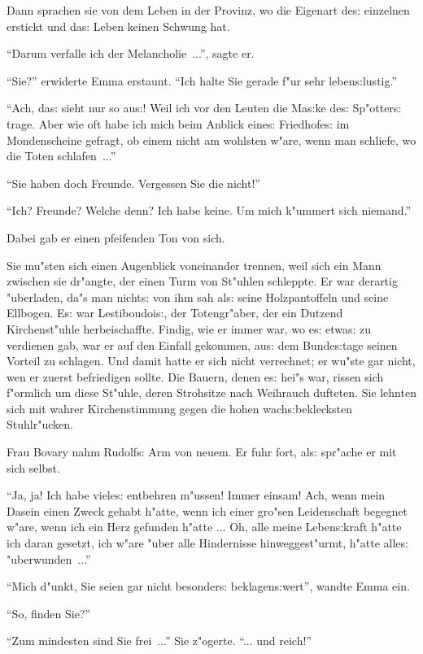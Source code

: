 \documentclass[oneside,12pt]{book}
\newcommand{\s}{s:}%
\begin{document}
Dann sprachen sie von dem Leben in der Provinz, wo die Eigenart
de{\s} einzelnen erstickt und da{\s} Leben keinen Schwung hat.

"`Darum verfalle ich der Melancholie~..."', sagte er.

"`Sie?"' erwiderte Emma erstaunt. "`Ich halte Sie gerade f"ur sehr
leben{\s}lustig."'

"`Ach, da{\s} sieht nur so au{\s}! Weil ich vor den Leuten die
Ma{\s}ke de{\s} Sp"otter{\s} trage. Aber wie oft habe ich mich
beim Anblick eine{\s} Friedhofe{\s} im Mondenscheine gefragt, ob
einem nicht am wohlsten w"are, wenn man schliefe, wo die Toten
schlafen~..."'

"`Sie haben doch Freunde. Vergessen Sie die nicht!"'

"`Ich? Freunde? Welche denn? Ich habe keine. Um mich k"ummert sich
niemand."'

Dabei gab er einen pfeifenden Ton von sich.

Sie mu"sten sich einen Augenblick voneinander trennen, weil sich
ein Mann zwischen sie dr"angte, der einen Turm von St"uhlen
schleppte. Er war derartig "uberladen, da"s man nicht{\s} von ihm
sah al{\s} seine Holzpantoffeln und seine Ellbogen. E{\s} war
Lestiboudoi{\s}, der Totengr"aber, der ein Dutzend Kirchenst"uhle
herbeischaffte. Findig, wie er immer war, wo e{\s} etwa{\s} zu
verdienen gab, war er auf den Einfall gekommen, au{\s} dem
Bunde{\s}tage seinen Vorteil zu schlagen. Und damit hatte er sich
nicht verrechnet; er wu"ste gar nicht, wen er zuerst befriedigen
sollte. Die Bauern, denen e{\s} hei"s war, rissen sich f"ormlich
um diese St"uhle, deren Strohsitze nach Weihrauch dufteten. Sie
lehnten sich mit wahrer Kirchenstimmung gegen die hohen
wach{\s}beklecksten Stuhlr"ucken.

Frau Bovary nahm Rudolf{\s} Arm von neuem. Er fuhr fort, al{\s}
spr"ache er mit sich selbst.

"`Ja, ja! Ich habe viele{\s} entbehren m"ussen! Immer einsam! Ach,
wenn mein Dasein einen Zweck gehabt h"atte, wenn ich einer gro"sen
Leidenschaft begegnet w"are, wenn ich ein Herz gefunden h"atte ...
Oh, alle meine Leben{\s}kraft h"atte ich daran gesetzt, ich w"are
"uber alle Hindernisse hinweggest"urmt, h"atte alle{\s}
"uberwunden~..."'

"`Mich d"unkt, Sie seien gar nicht besonder{\s} beklagen{\s}wert"',
wandte Emma ein.

"`So, finden Sie?"'

"`Zum mindesten sind Sie frei~..."' Sie z"ogerte. "`... und
reich!"'
\end{document}
